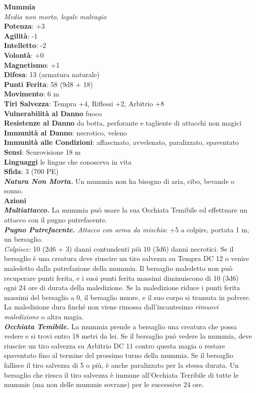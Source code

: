 \begin{multicols}{2}
\medskip\textbf{Mummia}\\
\emph{Media non morto, legale malvagio}\\
\textbf{Potenza}: +3\\
\textbf{Agilità}: -1\\
\textbf{Intelletto}: -2\\
\textbf{Volontà}: +0\\
\textbf{Magnetismo}: +1\\
\textbf{Difesa}: 13 (armatura naturale)\\
\textbf{Punti Ferita}: 58 (9d8 + 18)\\
\textbf{Movimento}: 6 m\\
\textbf{Tiri Salvezza}: Tempra +4, Riflessi +2, Arbitrio +8\\
\textbf{Vulnerabilità al Danno} fuoco\\
\textbf{Resistenze al Danno} da botta, perforante e tagliente di attacchi non magici\\
\textbf{Immunità al Danno}: necrotico, veleno\\
\textbf{Immunità alle Condizioni}: affascinato, avvelenato, paralizzato, spaventato\\
\textbf{Sensi}: Scurovisione 18 m \\
\textbf{Linguaggi} le lingue che conosceva in vita\\
\textbf{Sfida}: 3 (700 PE)\smallskip\\
\emph{\textbf{Natura Non Morta.}} Un mummia non ha bisogno di aria, cibo, bevande o sonno.\\
\smallskip\textbf{Azioni}\\
\emph{\textbf{Multiattacco.}} La mummia può usare la sua Occhiata Temibile ed effettuare un attacco con il pugno putrefacente.\\

\emph{\textbf{Pugno Putrefacente.} Attacco con arma da mischia}: +5 a colpire, portata 1 m, un bersaglio.\\

\emph{Colpisce:} 10 (2d6 + 3) danni contundenti più 10 (3d6) danni necrotici. Se il bersaglio è una creatura deve riuscire un tiro salvezza su Tempra DC 12 o venire maledetto dalla putrefazione della mummia. Il bersaglio maledetto non può recuperare punti ferita, e i suoi punti ferita massimi diminuiscono di 10 (3d6) ogni 24 ore di durata della maledizione. Se la maledizione riduce i punti ferita massimi del bersaglio a 0, il bersaglio muore, e il suo corpo si tramuta in polvere. La maledizione dura finché non viene rimossa dall'incantesimo \emph{rimuovi maledizione} o altra magia.\\
\emph{\textbf{Occhiata Temibile.}} La mummia prende a bersaglio una creatura che possa vedere e si trovi entro 18 metri da lei. Se il bersaglio può vedere la mummia, deve riuscire un tiro salvezza su Arbitrio DC 11 contro questa magia o restare spaventato fino al termine del prossimo turno della mummia. Se il bersaglio fallisce il tiro salvezza di 5 o più, è anche paralizzato per la stessa durata. Un bersaglio che riesca il tiro salvezza è immune all'Occhiata Terribile di tutte le mummie (ma non delle mummie sovrane) per le successive 24 ore.\\


\end{multicols}
